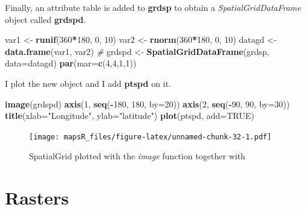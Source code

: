 \documentclass[]{report}
\newenvironment{Shaded}{\begin{snugshade}}{\end{snugshade}}
\newcommand{\CommentTok}[1]{\textcolor[rgb]{0.56,0.35,0.01}{\textit{#1}}}
\newcommand{\DataTypeTok}[1]{\textcolor[rgb]{0.13,0.29,0.53}{#1}}
\newcommand{\DecValTok}[1]{\textcolor[rgb]{0.00,0.00,0.81}{#1}}
\newcommand{\KeywordTok}[1]{\textcolor[rgb]{0.13,0.29,0.53}{\textbf{#1}}}
\newcommand{\NormalTok}[1]{#1}
\newcommand{\OperatorTok}[1]{\textcolor[rgb]{0.81,0.36,0.00}{\textbf{#1}}}
\newcommand{\OtherTok}[1]{\textcolor[rgb]{0.56,0.35,0.01}{#1}}
\newcommand{\StringTok}[1]{\textcolor[rgb]{0.31,0.60,0.02}{#1}}
\begin{document}
Finally, an attribute table is added to \textbf{grdsp} to obtain a
\emph{SpatialGridDataFrame} object called \textbf{grdspd}.

\begin{Shaded}
\begin{Highlighting}[]
\NormalTok{var1 <-}\StringTok{ }\KeywordTok{runif}\NormalTok{(}\DecValTok{360}\OperatorTok{*}\DecValTok{180}\NormalTok{, }\DecValTok{0}\NormalTok{, }\DecValTok{10}\NormalTok{)}
\NormalTok{var2 <-}\StringTok{ }\KeywordTok{rnorm}\NormalTok{(}\DecValTok{360}\OperatorTok{*}\DecValTok{180}\NormalTok{, }\DecValTok{0}\NormalTok{, }\DecValTok{10}\NormalTok{)}
\NormalTok{datagd <-}\StringTok{ }\KeywordTok{data.frame}\NormalTok{(var1, var2)}
\CommentTok{#}
\NormalTok{grdspd <-}\StringTok{ }\KeywordTok{SpatialGridDataFrame}\NormalTok{(grdsp, }\DataTypeTok{data=}\NormalTok{datagd)}
\KeywordTok{par}\NormalTok{(}\DataTypeTok{mar=}\KeywordTok{c}\NormalTok{(}\DecValTok{4}\NormalTok{,}\DecValTok{4}\NormalTok{,}\DecValTok{1}\NormalTok{,}\DecValTok{1}\NormalTok{))}
\end{Highlighting}
\end{Shaded}

I plot the new object and I add \textbf{ptspd} on it.

\begin{Shaded}
\begin{Highlighting}[]
\KeywordTok{image}\NormalTok{(grdspd)}
\KeywordTok{axis}\NormalTok{(}\DecValTok{1}\NormalTok{, }\KeywordTok{seq}\NormalTok{(}\OperatorTok{-}\DecValTok{180}\NormalTok{, }\DecValTok{180}\NormalTok{, }\DataTypeTok{by=}\DecValTok{20}\NormalTok{))}
\KeywordTok{axis}\NormalTok{(}\DecValTok{2}\NormalTok{, }\KeywordTok{seq}\NormalTok{(}\OperatorTok{-}\DecValTok{90}\NormalTok{, }\DecValTok{90}\NormalTok{, }\DataTypeTok{by=}\DecValTok{30}\NormalTok{))}
\KeywordTok{title}\NormalTok{(}\DataTypeTok{xlab=}\StringTok{"Longitude"}\NormalTok{, }\DataTypeTok{ylab=}\StringTok{"latitude"}\NormalTok{)}
\KeywordTok{plot}\NormalTok{(ptspd, }\DataTypeTok{add=}\OtherTok{TRUE}\NormalTok{)}
\end{Highlighting}
\end{Shaded}

\begin{figure}
\centering
\texttt{[image: mapsR\_files/figure-latex/unnamed-chunk-32-1.pdf]}
\caption{SpatialGrid plotted with the \emph{image} function together
with}
\end{figure}

\hypertarget{rasters}{%
\chapter{Rasters}\label{rasters}}
\end{document}
